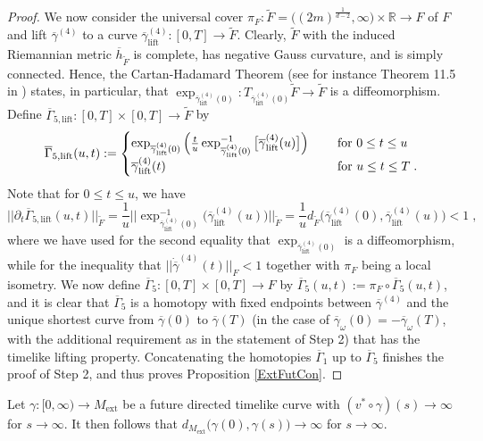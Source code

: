 \documentclass[reqno]{article}
\newcommand{\R}{\mathbb{R}}
\newcommand{\Mext}{M_{\mathrm{ext}}}
\newcommand{\ovg}{\overline{\gamma}}
\begin{document}
\begin{proof}
We now consider the universal cover $\pi_F : \tilde{F} = \big((2m)^{\frac{1}{d-2}}, \infty\big) \times \R \to F$  of $F$ and lift $\ovg^{(4)}$ to a curve $\ovg^{(4)}_{\mathrm{lift}} : [0,T] \to \tilde{F}$. Clearly, $\tilde{F}$ with the induced Riemannian metric $\overline{h}_{\tilde{F}}$ is complete, has negative Gauss curvature, and is simply connected.
Hence, the Cartan-Hadamard Theorem (see for instance Theorem 11.5 in \cite{LeeRiem}) states, in particular, that $\exp_{\ovg_{\mathrm{lift}}^{(4)}(0)} : T_{\ovg_{\mathrm{lift}}^{(4)}(0)} \tilde{F} \to \tilde{F}$ is a diffeomorphism. Define $\overline{\Gamma}_{5, \mathrm{lift}} : [0,T] \times [0,T] \to \tilde{F}$ by
\begin{equation*}
\overline{\Gamma}_{5,\mathrm{lift}} (u,t) := \begin{cases} \exp_{\ovg_{\mathrm{lift}}^{(4)}(0)} \Big( \frac{t}{u} \exp^{-1}_{\ovg_{\mathrm{lift}}^{(4)}(0)}\big[\ovg_{\mathrm{lift}}^{(4)} (u) \big]\Big) \quad &\textnormal{ for } 0 \leq t \leq u \\
\ovg_{\mathrm{lift}}^{(4)}(t) &\textnormal{ for } u \leq t \leq T \;.
\end{cases}
\end{equation*}
Note that for $0 \leq t \leq u$, we have
\begin{equation*}
|| \partial_t \overline{\Gamma}_{5, \mathrm{lift}} (u,t) ||_{\tilde{F}} = \frac{1}{u} || \exp^{-1}_{\ovg_{\mathrm{lift}}^{(4)}(0)} \big( \ovg^{(4)}_{\mathrm{lift}}(u)\big)||_{\tilde{F}} = \frac{1}{u} d_{\tilde{F}} \big( \ovg^{(4)}_{\mathrm{lift}}(0), \ovg^{(4)}_{\mathrm{lift}}(u)\big) < 1 \;,
\end{equation*}
where we have used for the second equality that $\exp_{\ovg_{\mathrm{lift}}^{(4)}(0)}$ is a diffeomorphism, while for the inequality that $||\dot{\ovg}^{(4)} (t) ||_F < 1$ together with $\pi_F$ being a local isometry. We now define $\overline{\Gamma}_5 : [0,T] \times [0,T] \to F$ by $\overline{\Gamma}_5(u,t) := \pi_F \circ \overline{\Gamma}_5(u,t)$, and it is clear that $\overline{\Gamma}_5$ is a homotopy with fixed endpoints between $\ovg^{(4)}$ and the unique shortest curve from $\ovg(0)$ to $\ovg(T)$ (in the case of $\ovg_\omega(0) = - \ovg_\omega(T)$, with the additional requirement as in the statement of Step 2) that has the timelike lifting property. Concatenating the homotopies $\overline{\Gamma}_1$ up to $\overline{\Gamma}_5$ finishes the proof of Step 2, and thus proves Proposition \ref{ExtFutCon}.
\end{proof}


\begin{proposition}\label{schwprop:LengthToInfty}
\label{LengthToInfty}
Let $\gamma : [0,\infty) \to \Mext$ be a future directed timelike curve with $(v^* \circ \gamma)(s) \to \infty$ for $s \to \infty$. It then follows that $d_{\Mext}\big(\gamma(0), \gamma(s)\big) \to \infty$ for $s \to \infty$.
\end{proposition}
\end{document}
